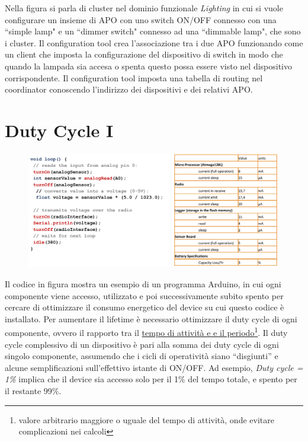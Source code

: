 Nella figura si parla di cluster nel dominio funzionale \emph{Lighting} in cui si vuole configurare un insieme di APO con uno switch ON/OFF connesso con una ``simple lamp" e un ``dimmer switch" connesso ad una ``dimmable lamp", che sono i cluster. Il configuration tool crea l'associazione tra i due APO funzionando come un client che imposta la configurazione del dispositivo di switch in modo che quando la lampada sia accesa o spenta questo possa essere visto nel dispositivo corrispondente. Il configuration tool imposta una tabella di routing nel coordinator conoscendo l'indirizzo dei dispositivi e dei relativi APO.

\section{Duty Cycle I}

\begin{figure}[htbp]
   \centering
   \includegraphics{images/questions/Schermata del 2023-10-19 15-42-33.png}
   \label{fig:dom12}
\end{figure}

Il codice in figura mostra un esempio di un programma Arduino, in cui ogni componente viene accesso, utilizzato e poi successivamente subito spento per cercare di ottimizzare il consumo energetico del device su cui questo codice è installato. 
Per aumentare il lifetime è necessario ottimizzare il duty cycle di ogni componente, ovvero il rapporto tra il \ul{tempo di attività e e il periodo}\footnote{valore arbitrario maggiore o uguale del tempo di attività, onde evitare complicazioni nei calcoli}.
Il duty cycle complessivo di un dispositivo è pari alla somma dei duty cycle di ogni singolo componente, assumendo che i cicli di operatività siano ``disgiunti'' e alcune semplificazioni sull'effettivo istante di ON/OFF.
Ad esempio, \textit{Duty cycle = 1\%} implica che il device sia accesso solo per il 1\% del tempo totale, e spento per il restante 99\%.

